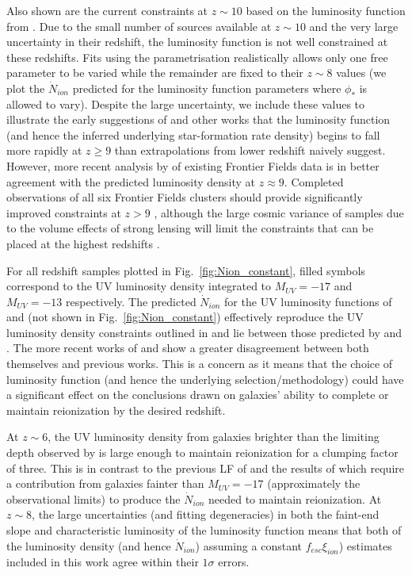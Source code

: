 Also shown are the current constraints at $z\sim10$ based on the luminosity function from \citet{Oesch:2014cs}. Due to the small number of sources available at $z\sim10$ and the very large uncertainty in their redshift, the luminosity function is not well constrained at these redshifts. Fits using the \citet{Schechter:1976gl} parametrisation realistically allows only one free parameter to be varied while the remainder are fixed to their $z\sim8$ values (we plot the $\dot{N}_{ion}$ predicted for the luminosity function parameters where $\phi_{*}$ is allowed to vary). Despite the large uncertainty, we include these values to illustrate the early suggestions of \citet{Oesch:2014cs} and other works \citep{Zheng:2012hu,Coe:2012ko} that the luminosity function (and hence the inferred underlying star-formation rate density) begins to fall more rapidly at $z \geq 9$ than extrapolations from lower redshift naively suggest. However, more recent analysis by \citet{McLeod:2014wz} of existing Frontier Fields data is in better agreement with the predicted luminosity density at $z \approx 9$. Completed observations of all six Frontier Fields clusters should provide significantly improved constraints at $z>9$ \citep{Coe:2014tq}, although the large cosmic variance of samples due to the volume effects of strong lensing will limit the constraints that can be placed at the highest redshifts \citep{Robertson:2014uv}.

For all redshift samples plotted in Fig.~\ref{fig:Nion_constant}, filled symbols correspond to the UV luminosity density integrated to $M_{UV} = -17$ and $M_{UV} = -13$ respectively. The predicted $\dot{N}_{ion}$ for the UV luminosity functions of \citet{Schenker:2013cl} and \citet{McLure:2013hh} (not shown in Fig.~\ref{fig:Nion_constant}) effectively reproduce the UV luminosity density constraints outlined in \citet{Robertson:2013ji} and lie between those predicted by \citet{Bouwens:2014tx} and \citet{Finkelstein:2014ub}. The more recent works of \citet{Bouwens:2014tx} and \citet{Finkelstein:2014ub} show a greater disagreement between both themselves and previous works. This is a concern as it means that the choice of luminosity function (and hence the underlying selection/methodology) could have a significant effect on the conclusions drawn on galaxies' ability to complete or maintain reionization by the desired redshift.

At $z\sim6$, the UV luminosity density from galaxies brighter than the limiting depth observed by \citet{Bouwens:2014tx} is large enough to maintain reionization for a clumping factor of three. This is in contrast to the previous LF of \citet{Anonymous:96uKWdy6} and the results of \citet{Finkelstein:2014ub} which require a contribution from galaxies fainter than $M_{UV} = -17$ (approximately the observational limits) to produce the $\dot{N}_{ion}$ needed to maintain reionization. At $z\sim8$, the large uncertainties (and fitting degeneracies) in both the faint-end slope and characteristic luminosity of the luminosity function means that both of the luminosity density (and hence $\dot{N}_{ion}$) assuming a constant $f_{esc}\xi_{ion}$) estimates included in this work agree within their $1\sigma$ errors.


